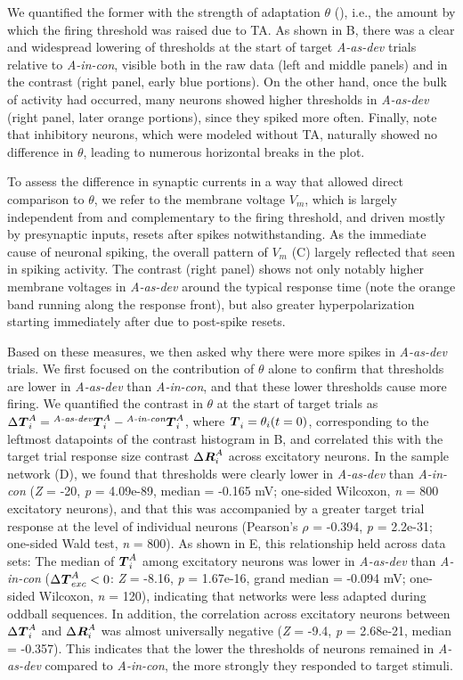 \documentclass[9pt,lineno,onehalfspacing]{elife}
\newcommand{\dev}{\textit{A-as-dev}}
\newcommand{\msc}{\textit{A-in-con}}
\newcommand{\std}{\textit{A-as-std}}
\newcommand{\ifstringequal}[4]{%
  \ifnum\pdfstrcmp{#1}{#2}=0
  #3%
  \else
  #4%
  \fi
}
\newcommand{\seqreplace}[1]{\ifstringequal{dev}{#1}{\dev}{%
    \ifstringequal{std}{#1}{\std}{%
        \ifstringequal{msc}{#1}{\msc}{#1}%
    }%
}}
\newcommand{\R}[3][]{{}^{\seqreplace{#1}}_{}\boldsymbol R^{#2}_{#3}}
\newcommand{\T}[3][]{{}^{\seqreplace{#1}}_{}\boldsymbol T^{#2}_{#3}}
\begin{document}
We quantified the former with the strength of adaptation $\theta$ (), i.e., the amount by which the firing threshold was raised due to TA. As shown in B, there was a clear and widespread lowering of thresholds at the start of target \dev{} trials relative to \msc{}, visible both in the raw data (left and middle panels) and in the contrast (right panel, early blue portions). On the other hand, once the bulk of activity had occurred, many neurons showed higher thresholds in \dev{} (right panel, later orange portions), since they spiked more often. Finally, note that inhibitory neurons, which were modeled without TA, naturally showed no difference in $\theta$, leading to numerous horizontal breaks in the plot.

To assess the difference in synaptic currents in a way that allowed direct comparison to $\theta$, we refer to the membrane voltage $V_m$, which is largely independent from and complementary to the firing threshold, and driven mostly by presynaptic inputs, resets after spikes notwithstanding. As the immediate cause of neuronal spiking, the overall pattern of $V_m$ (C) largely reflected that seen in spiking activity. The contrast (right panel) shows not only notably higher membrane voltages in \dev{} around the typical response time (note the orange band running along the response front), but also greater hyperpolarization starting immediately after due to post-spike resets.

Based on these measures, we then asked why there were more spikes in \dev{} trials. We first focused on the contribution of $\theta$ alone to confirm that thresholds are lower in \dev{} than \msc{}, and that these lower thresholds cause more firing. We quantified the contrast in $\theta$ at the start of target trials as $\Delta \T{A}{i} = \T[dev]{A}{i} - \T[msc]{A}{i}$, where $\T{}{i} = \theta_i(t=0)$, corresponding to the leftmost datapoints of the contrast histogram in B, and correlated this with the target trial response size contrast $\Delta \R{A}{i}$ across excitatory neurons. In the sample network (D), we found that thresholds were clearly lower in \dev{} than \msc{} (\textit{Z} = -20, \textit{p} = 4.09e-89, median = -0.165 mV; one-sided Wilcoxon, \textit{n} = 800 excitatory neurons), and that this was accompanied by a greater target trial response at the level of individual neurons (Pearson's $\rho$ = -0.394, \textit{p} = 2.2e-31; one-sided Wald test, \textit{n} = 800). As shown in E, this relationship held across data sets: The median of $\T{A}{i}$ among excitatory neurons was lower in \dev{} than \msc{} ($\Delta \T{A}{exc} < 0$: \textit{Z} = -8.16, \textit{p} = 1.67e-16, grand median = -0.094 mV; one-sided Wilcoxon, \textit{n} = 120), indicating that networks were less adapted during oddball sequences. In addition, the correlation across excitatory neurons between $\Delta \T{A}{i}$ and $\Delta \R{A}{i}$ was almost universally negative (\textit{Z} = -9.4, \textit{p} = 2.68e-21, median = -0.357). This indicates that the lower the thresholds of neurons remained in \dev{} compared to \msc{}, the more strongly they responded to target stimuli.
\end{document}
